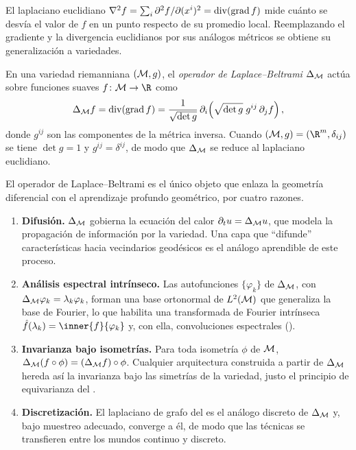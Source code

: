 El laplaciano euclidiano $\nabla^2 f = \sum_i \partial^2 f / \partial(x^i)^2 =
\operatorname{div}(\operatorname{grad} f)$ mide cu\'anto se desv\'ia el valor de $f$ en un punto
respecto de su promedio local. Reemplazando el gradiente y la divergencia
euclidianos por sus an\'alogos m\'etricos se obtiene su generalizaci\'on a
variedades.

\begin{definition}
\label{def:geo:laplace-beltrami}
En una variedad riemanniana $(\mathcal{M}, g)$, el \emph{operador de Laplace--Beltrami}
$\Delta_{\mathcal{M}}$ act\'ua sobre funciones suaves $f \colon \M \to \R$ como
\[
  \Delta_{\mathcal{M}} f = \operatorname{div}(\operatorname{grad} f)
    = \frac{1}{\sqrt{\det g}}\, \partial_i\!\left(\sqrt{\det g}\; g^{ij}\, \partial_j f\right),
\]
donde $g^{ij}$ son las componentes de la m\'etrica inversa. Cuando
$(\M, g) = (\R^m, \delta_{ij})$ se tiene $\det g = 1$ y $g^{ij} = \delta^{ij}$,
de modo que $\Delta_{\mathcal{M}}$ se reduce al laplaciano euclidiano.
\end{definition}

El operador de Laplace--Beltrami es el \'unico objeto que enlaza la geometr\'ia
diferencial con el aprendizaje profundo geom\'etrico, por cuatro razones.

\begin{remark}
\label{rem:geo:lb-role}
\leavevmode
\begin{enumerate}
  \item \textbf{Difusi\'on.} $\Delta_{\mathcal{M}}$ gobierna la ecuaci\'on del calor
    $\partial_t u = \Delta_{\mathcal{M}} u$, que modela la propagaci\'on de informaci\'on
    por la variedad. Una capa que ``difunde'' caracter\'isticas hacia
    vecindarios geod\'esicos es el an\'alogo aprendible de este proceso.
  \item \textbf{An\'alisis espectral intr\'inseco.} Las autofunciones
    $\{\varphi_k\}$ de $\Delta_{\mathcal{M}}$, con $\Delta_{\mathcal{M}} \varphi_k = \lambda_k
    \varphi_k$, forman una base ortonormal de $L^2(\mathcal{M})$ que generaliza la base
    de Fourier, lo que habilita una transformada de Fourier intr\'inseca
    $\hat f(\lambda_k) = \inner{f}{\varphi_k}$ y, con ella, convoluciones
    espectrales ().
  \item \textbf{Invarianza bajo isometr\'ias.} Para toda isometr\'ia $\phi$ de
    $\mathcal{M}$, $\Delta_{\mathcal{M}}(f \circ \phi) = (\Delta_{\mathcal{M}} f) \circ \phi$. Cualquier
    arquitectura construida a partir de $\Delta_{\mathcal{M}}$ hereda as\'i la invarianza
    bajo las simetr\'ias de la variedad, justo el principio de equivarianza del
    .
  \item \textbf{Discretizaci\'on.} El laplaciano de grafo del 
    es el an\'alogo discreto de $\Delta_{\mathcal{M}}$ y, bajo muestreo adecuado, converge
    a \'el, de modo que las t\'ecnicas se transfieren entre los mundos continuo
    y discreto.
\end{enumerate}
\end{remark}

